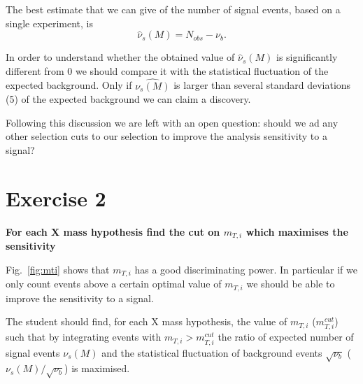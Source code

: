 \documentclass[a4paper,12pt]{article}
\begin{document}
The best estimate that we can give of the number of signal events, based on a
single experiment, is
\begin{equation}
\hat{\nu}_s(M)=N_{obs}-\nu_b.
\label{eq:nuhat}
\end{equation}

In order to understand whether the obtained value of $\hat{\nu}_s(M)$ is
significantly different from 0 we should compare it with the statistical
fluctuation of the expected background. Only if $\hat{\nu_s(M)}$ is larger
than several standard deviations (5) of the expected background we can claim a
discovery.

Following this discussion we are left with an open question: should we ad any
other selection cuts to our selection to improve the analysis sensitivity to a
signal?

\section*{Exercise 2}
{\bf For each X mass hypothesis find the cut on $m_{T,i}$ which maximises the
sensitivity}

Fig.~\ref{fig:mti} shows that $m_{T,i}$ has a good discriminating power. In
particular if we only count events above a certain optimal value of  $m_{T,i}$ we
should be able to improve the sensitivity to a signal. 

The student should find, for each X mass hypothesis, the value of $m_{T,i}$
($m_{T,i}^{cut}$) such that by integrating events with
$m_{T,i}>m_{T,i}^{cut}$ the ratio of expected number of signal events
$\nu_s(M)$ and the statistical fluctuation of background events
$\sqrt{\nu_b}$ ($\nu_s(M)/\sqrt{\nu_b}$) is maximised.
\end{document}
